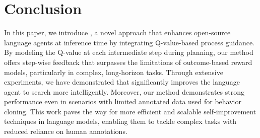 \section{Conclusion}

In this paper, we introduce {\ours}, a novel approach that enhances open-source language agents at inference time by integrating Q-value-based process guidance. By modeling the Q-value at each intermediate step during planning, our method offers step-wise feedback that surpasses the limitations of outcome-based reward models, particularly in complex, long-horizon tasks. 
Through extensive experiments, we have demonstrated that {\ours} significantly improves the language agent to search more intelligently. Moreover, our method demonstrates strong performance even in scenarios with limited annotated data used for behavior cloning. This work paves the way for more efficient and scalable self-improvement techniques in language models, enabling them to tackle complex tasks with reduced reliance on human annotations.









